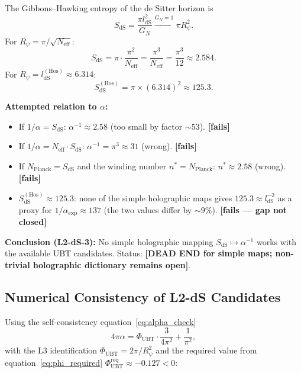 \documentclass[11pt,a4paper]{article}
\theoremstyle{definition}
\theoremstyle{remark}
\begin{document}
The Gibbons--Hawking entropy of the de Sitter horizon is
\begin{equation}
  S_{\mathrm{dS}} = \frac{\pi l_{\mathrm{dS}}^2}{G_N}
  \xrightarrow{G_N=1} \pi R_\psi^2.
  \label{eq:S_dS}
\end{equation}
For $R_\psi = \pi/\sqrt{N_{\mathrm{eff}}}$:
\begin{equation}
  S_{\mathrm{dS}} = \pi \cdot \frac{\pi^2}{N_{\mathrm{eff}}}
  = \frac{\pi^3}{N_{\mathrm{eff}}}
  = \frac{\pi^3}{12}
  \approx 2.584.
  \label{eq:S_dS_candidate}
\end{equation}
For $R_\psi = l_{\mathrm{dS}}^{(\mathrm{Hos})} \approx 6.314$:
\begin{equation}
  S_{\mathrm{dS}}^{(\mathrm{Hos})} = \pi \times (6.314)^2 \approx 125.3.
  \label{eq:S_dS_hosotani}
\end{equation}

\textbf{Attempted relation to $\alpha$:}
\begin{itemize}
\item If $1/\alpha = S_{\mathrm{dS}}$:
  $\alpha^{-1} \approx 2.58$ (too small by factor $\sim 53$). \textbf{[fails]}
\item If $1/\alpha = N_{\mathrm{eff}}\cdot S_{\mathrm{dS}}$:
  $\alpha^{-1} = \pi^3 \approx 31$ (wrong). \textbf{[fails]}
\item If $N_{\mathrm{Planck}} = S_{\mathrm{dS}}$ and the winding number
  $n^* = N_{\mathrm{Planck}}$:
  $n^* \approx 2.58$ (wrong). \textbf{[fails]}
\item $S_{\mathrm{dS}}^{(\mathrm{Hos})} \approx 125.3$:
  none of the simple holographic maps gives $125.3 \approx l_{\mathrm{dS}}^{-2}$
  as a proxy for $1/\alpha_{\mathrm{exp}}\approx 137$
  (the two values differ by $\sim 9\%$). \textbf{[fails --- gap not closed]}
\end{itemize}

\textbf{Conclusion (L2-dS-3):}
No simple holographic mapping $S_{\mathrm{dS}} \mapsto \alpha^{-1}$ works
with the available UBT candidates.
Status: \textbf{[DEAD END for simple maps; non-trivial holographic
dictionary remains open]}.

\subsection{Numerical Consistency of L2-dS Candidates}
\label{subsec:L2dS_numcheck}

Using the self-consistency equation~\eqref{eq:alpha_check}
\begin{equation}
  4\pi\alpha
  = \Phi_{\mathrm{UBT}} \cdot \frac{3}{4\pi^2} + \frac{1}{\pi^2},
\end{equation}
with the L3 identification $\Phi_{\mathrm{UBT}} = 2\pi/R_\psi^2$
and the required value from equation~\eqref{eq:phi_required}
$\Phi_{\mathrm{UBT}}^{\mathrm{req}} \approx -0.127 < 0$:
\end{document}
